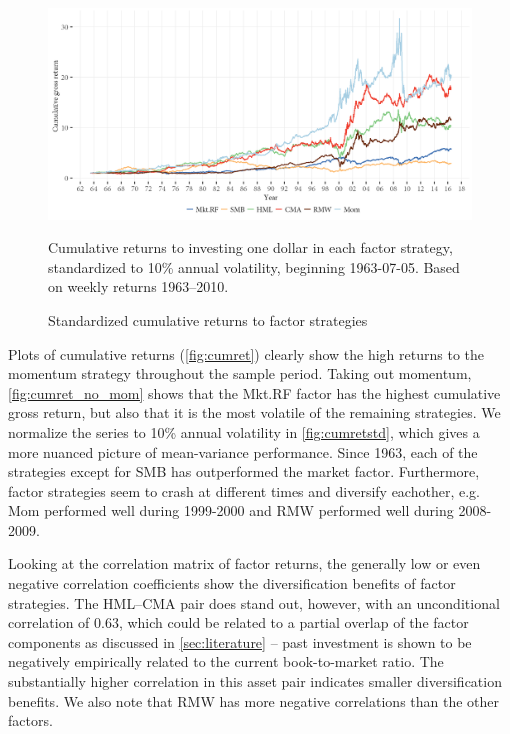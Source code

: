 \begin{figure}[htbp]
  \centering
  \includegraphics[scale=1]{graphics/cumretStdPlot.png}  
  \footnotesize
  \caption{Standardized cumulative returns to factor strategies}
  \begin{longcaption}
    Cumulative returns to investing one dollar in each factor strategy, standardized to 10\% annual volatility, beginning 1963-07-05. Based on weekly returns 1963--2010.
  \end{longcaption}
  \label{fig:cumretstd}
\end{figure}

Plots of cumulative returns (\autoref{fig:cumret}) clearly show the high returns to the momentum strategy throughout the sample period. Taking out momentum, \autoref{fig:cumret_no_mom} shows that the Mkt.RF factor has the highest cumulative gross return, but also that it is the most volatile of the remaining strategies. We normalize the series to 10\% annual volatility in \autoref{fig:cumretstd}, which gives a more nuanced picture of mean-variance performance. Since 1963, each of the strategies except for SMB has outperformed the market factor. Furthermore, factor strategies seem to crash at different times and diversify eachother, e.g. Mom performed well during 1999-2000 and RMW performed well during 2008-2009.

Looking at the correlation matrix of factor returns, the generally low or even negative correlation coefficients show the diversification benefits of factor strategies. The HML--CMA pair does stand out, however, with an unconditional correlation of 0.63, which could be related to a partial overlap of the factor components as discussed in \autoref{sec:literature} -- past investment is shown to be negatively empirically related to the current book-to-market ratio. The substantially higher correlation in this asset pair indicates smaller diversification benefits. We also note that RMW has more negative correlations than the other factors.
\FloatBarrier

